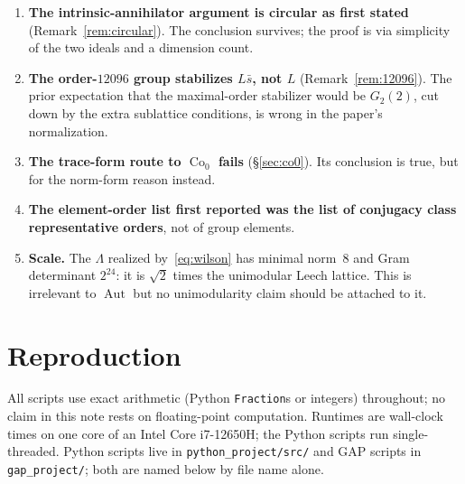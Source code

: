 \documentclass[11pt]{amsart}
\newcommand{\LL}{\Lambda}
\DeclareMathOperator{\Aut}{Aut}
\DeclareMathOperator{\Co}{Co}
\theoremstyle{definition}
\theoremstyle{remark}
\begin{document}
\begin{enumerate}[label=\textbf{C\arabic*.}, leftmargin=*]
\item \textbf{The intrinsic-annihilator argument is circular as first stated}
  (Remark~\ref{rem:circular}). The conclusion survives; the proof is via
  simplicity of the two ideals and a dimension count.
\item \textbf{The order-$12096$ group stabilizes $L\bar s$, not $L$}
  (Remark~\ref{rem:12096}). The prior expectation that the maximal-order
  stabilizer would be $G_2(2)$, cut down by the extra sublattice conditions, is
  wrong in the paper's normalization.
\item \textbf{The trace-form route to $\Co_0$ fails} (\S\ref{sec:co0}). Its
  conclusion is true, but for the norm-form reason instead.
\item \textbf{The element-order list first reported was the list of conjugacy
  class representative orders}, not of group elements.
\item \textbf{Scale.} The $\LL$ realized by~\eqref{eq:wilson} has minimal
  norm~$8$ and Gram determinant $2^{24}$: it is $\sqrt2$ times the unimodular
  Leech lattice. This is irrelevant to $\Aut$ but no unimodularity claim should
  be attached to it.
\end{enumerate}

\section{Reproduction}\label{sec:repro}

All scripts use exact arithmetic (Python \texttt{Fraction}s or integers)
throughout; no claim in this note rests on floating-point computation. Runtimes
are wall-clock times on one core of an Intel Core i7-12650H; the Python
scripts run single-threaded. Python scripts live in
\texttt{python\_project/src/} and GAP scripts in \texttt{gap\_project/}; both
are named below by file name alone.
\end{document}
